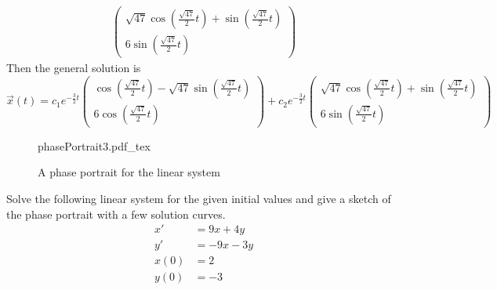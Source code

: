 \documentclass[11pt, titlepage]{article}
\begin{document}
\begin{solution}
\begin{align*}
\begin{pmatrix}
        \sqrt{47} \cos(\frac{\sqrt{47}}{2} t) + \sin(\frac{\sqrt{47}}{2} t) \\
        6 \sin(\frac{\sqrt{47}}{2} t)
      \end{pmatrix}
    \end{align*}
    Then the general solution is
    \begin{equation*}
      \vec{x}(t) = c_{1} e^{-\frac{3}{2} t}
      \begin{pmatrix}
        \cos(\frac{\sqrt{47}}{2} t) - \sqrt{47} \sin(\frac{\sqrt{47}}{2} t) \\
        6 \cos(\frac{\sqrt{47}}{2} t)
      \end{pmatrix} +
      c_{2} e^{-\frac{3}{2} t}
      \begin{pmatrix}
        \sqrt{47} \cos(\frac{\sqrt{47}}{2} t) + \sin(\frac{\sqrt{47}}{2} t) \\
        6 \sin(\frac{\sqrt{47}}{2} t)
      \end{pmatrix}
    \end{equation*}

    \begin{figure}[h]
      \centering
      \def\svgwidth{0.3\columnwidth}
      {phasePortrait3.pdf_tex}
      \captionsetup{labelformat=empty}
      \caption{A phase portrait for the linear system}
    \end{figure}
  \end{solution}

  \pagebreak

  \begin{problem}[Judson 3.5.7]
    Solve the following linear system for the given initial values and give a sketch of the phase portrait with a few solution curves.
    \begin{align*}
      x' &= 9x + 4y \\
      y' &= -9x - 3y \\
      x(0) &= 2 \\
      y(0) &= -3
    \end{align*}
  \end{problem}
\end{document}
